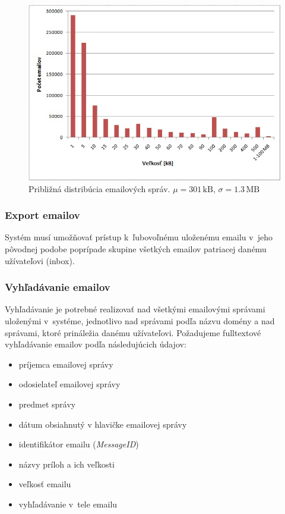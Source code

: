 \documentclass[11pt,twoside,a4paper]{book}
\begin{document}
\begin{figure}[h]
 \centering
 \includegraphics[width=12cm]{./figures/emailsHist.png}
 \caption{Približná distribúcia emailových správ. $\mu = 301\,\mathrm{kB}$, $\sigma = 1.3\,\mathrm{MB}$}
 \label{fig:emailHist}
\end{figure}


\subsubsection*{Export emailov}
Systém musí umožňovať prístup k~ľubovoľnému uloženému emailu v~jeho pôvodnej podobe poprípade skupine všetkých emailov patriacej danému užívateľovi (inbox).

\subsubsection*{Vyhľadávanie emailov}
Vyhľadávanie je potrebné realizovať nad všetkými emailovými správami uloženými v~systéme, jednotlivo nad správami podľa názvu domény a nad správami, ktoré prináležia danému užívateľovi. Požadujeme fulltextové vyhľadávanie emailov podľa následujúcich údajov:
\begin{itemize}
 \item
  príjemca emailovej správy
 \item
  odosielateľ emailovej správy
 \item
  predmet správy
 \item
  dátum obsiahnutý v hlavičke emailovej správy
 \item
  identifikátor emailu (\emph{MessageID})
 \item
  názvy príloh a ich veľkosti %
 \item
  veľkosť emailu
 \item
  vyhľadávanie v~tele emailu
\end{itemize}
\end{document}
